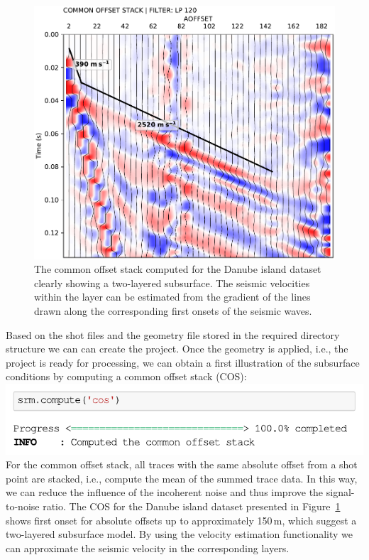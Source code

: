\documentclass[a4paper,fleqn]{cas-sc}
\begin{document}
\begin{figure}
	\centering
	\includegraphics[width=.75\textwidth]{figures/danube_island_cos_lp120.pdf}
	\caption{The common offset stack computed for the Danube island dataset clearly showing a two-layered subsurface. The seismic velocities within the layer can be estimated from the gradient of the lines drawn along the corresponding first onsets of the seismic waves.}
	\label{fig:fieldcos}
\end{figure}

Based on the shot files and the geometry file stored in the required directory structure we can can create the project. Once the geometry is applied, i.e., the project is ready for processing, we can obtain a first illustration of the subsurface conditions by computing a common offset stack (COS):
\newline
\includegraphics[width=.5\textwidth]{./figures/plotcos_danube.pdf}
\newline
For the common offset stack, all traces with the same absolute offset from a shot point are stacked, i.e., compute the mean of the summed trace data. In this way, we can reduce the influence of the incoherent noise and thus improve the signal-to-noise ratio. The COS for the Danube island dataset presented in Figure~\ref{fig:fieldcos} shows first onset for absolute offsets up to approximately 150\,m, which suggest a two-layered subsurface model. By using the velocity estimation functionality we can approximate the seismic velocity in the corresponding layers.
\end{document}
